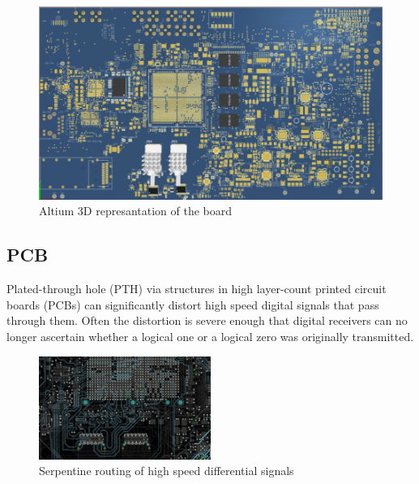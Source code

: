 \documentclass[a4paper]{PoS}
\begin{document}
\begin{figure}
\centering
\includegraphics[width=1\textwidth]{board_3D_altium.png}
\caption{Altium 3D represantation of the board}
\label{fig1}
\end{figure}

\subsection{PCB}
Plated-through hole (PTH) via structures in high layer-count printed circuit boards (PCBs) can significantly distort high speed digital signals that pass through them. Often the  distortion is severe enough that digital receivers can no longer ascertain whether a  logical one or a logical zero was originally transmitted. 

\begin{figure}
\centering
\includegraphics[width=0.5\textwidth]{serpentine_routing.png}
\caption{Serpentine routing of high speed differential signals}
\label{fig2}
\end{figure}
\end{document}
